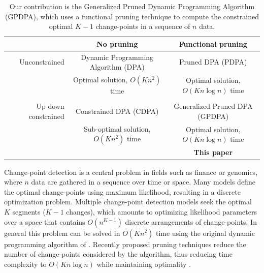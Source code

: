 \documentclass{article}
\begin{document}
\begin{table}
  \centering
  \begin{tabular}{r|c|c}
    & No pruning & Functional pruning \\
    \hline
    Unconstrained & Dynamic Programming Algorithm (DPA) & Pruned DPA (PDPA) \\
    & Optimal solution, $O(Kn^2)$ time & Optimal solution, $O(Kn\log n)$ time\\
    & \citet{segment-neighborhood, optimal-partitioning}     & \citet{pruned-dp, johnson} \\
    \hline
    Up-down constrained & Constrained DPA (CDPA) & Generalized Pruned DPA (GPDPA) \\
    & Sub-optimal solution, $O(Kn^2)$ time & Optimal solution, $O(Kn\log n)$ time\\
    & \citet{HOCKING-PeakSeg} & \textbf{This paper} \\
    \hline
  \end{tabular}
  \caption{Our contribution is 
the Generalized Pruned Dynamic Programming Algorithm (GPDPA), 
 which uses a functional pruning technique 
    to compute the constrained optimal $K-1$ change-points 
in a sequence of $n$ data.}
\label{tab:contribution}
\end{table}

Change-point detection is a central problem in fields such as finance
or genomics, where $n$ data are gathered in a sequence over time or
space. Many models define the optimal change-points using maximum
likelihood, resulting in a discrete optimization problem. Multiple
change-point detection models seek the optimal $K$ segments
($K-1$ changes), which amounts to optimizing likelihood
parameters over a space that contains $O(n^{K-1})$ discrete
arrangements of change-points. In general this problem can be solved
in $O(Kn^2)$ time using the original dynamic programming algorithm of
\citet{segment-neighborhood}. Recently proposed pruning techniques
reduce the number of change-points considered by the algorithm, thus
reducing time complexity to $O(K n\log n)$ while maintaining
optimality \citep{pruned-dp, pelt, johnson, fpop}.
\end{document}
